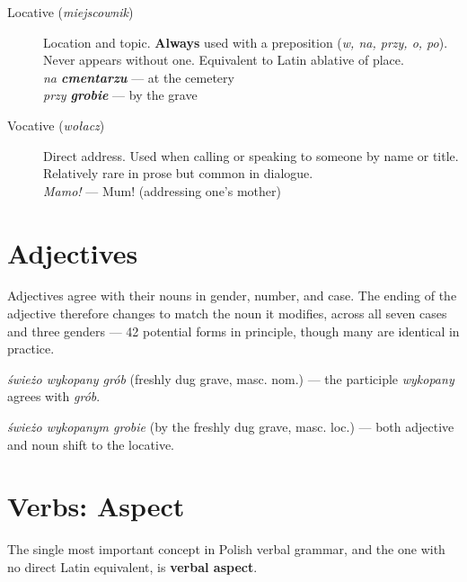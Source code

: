 \begin{description}
  \item[Locative (\textit{miejscownik})] Location and topic. 
    \textbf{Always} used with a preposition (\textit{w, na, przy, o, po}).
    Never appears without one. Equivalent to Latin ablative of place.\\
    \textit{na \textbf{cmentarzu}} — at the cemetery\\
    \textit{przy \textbf{grobie}} — by the grave

  \item[Vocative (\textit{wołacz})] Direct address. Used when calling 
    or speaking to someone by name or title. Relatively rare in prose 
    but common in dialogue.\\
    \textit{Mamo!} — Mum! (addressing one's mother)

\end{description}


\section{Adjectives}

Adjectives agree with their nouns in gender, number, and case. The 
ending of the adjective therefore changes to match the noun it modifies, 
across all seven cases and three genders — 42 potential forms in principle, 
though many are identical in practice.

\textit{świeżo wykopany grób} (freshly dug grave, masc. nom.) — the participle 
\textit{wykopany} agrees with \textit{grób}.

\textit{świeżo wykopanym grobie} (by the freshly dug grave, masc. loc.) — both 
adjective and noun shift to the locative.

\section{Verbs: Aspect}

The single most important concept in Polish verbal grammar, and the one 
with no direct Latin equivalent, is \textbf{verbal aspect}.

